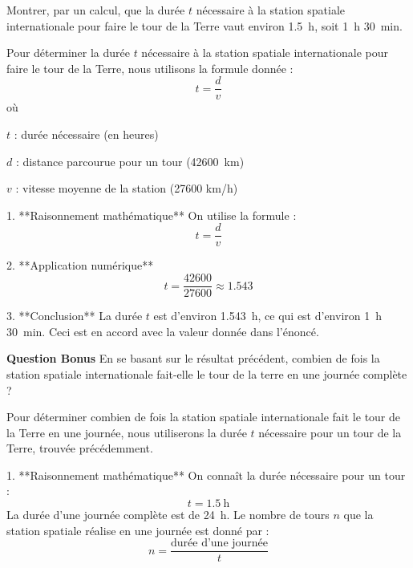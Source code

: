 \documentclass[answers]{exam}
\begin{document}
\begin{questions}
  Montrer, par un calcul, que la durée $t$ nécessaire à la station spatiale internationale pour faire le tour de la Terre vaut environ \SI{1.5}{\hour}, soit \SI{1}{\hour} \SI{30}{\minute}.
  
  

\begin{solution}
Pour déterminer la durée $t$ nécessaire à la station spatiale internationale pour faire le tour de la Terre, nous utilisons la formule donnée :
\[
t = \frac{d}{v}
\]
où

\begin{addmargin}[4em]{1em}
    \begin{compactitem}
        \item [$t$] : durée nécessaire (en heures)
        \item [$d$] : distance parcourue pour un tour (\SI{42600}{\kilo\meter})
        \item [$v$] : vitesse moyenne de la station (\num{27600} \unit[per-mode = symbol]{\kilo\meter\per\hour})
    \end{compactitem}
\end{addmargin}

1. **Raisonnement mathématique**  
   On utilise la formule :  
   \[
   t = \frac{d}{v}
   \]

2. **Application numérique**  
   \[
   t = \frac{42600}{27600} \approx 1.543
   \]

3. **Conclusion**  
   La durée $t$ est d'environ \SI{1.543}{\hour}, ce qui est d'environ \SI{1}{\hour} \SI{30}{\minute}. Ceci est en accord avec la valeur donnée dans l'énoncé.
\end{solution}

\question[2] \textbf{Question Bonus} En se basant sur le résultat précédent, combien de fois la station spatiale internationale fait-elle le tour de la terre en une journée complète ?



\begin{solution}
Pour déterminer combien de fois la station spatiale internationale fait le tour de la Terre en une journée, nous utiliserons la durée $t$ nécessaire pour un tour de la Terre, trouvée précédemment.

1. **Raisonnement mathématique**  
   On connaît la durée nécessaire pour un tour :
   \[
   t = \SI{1.5}{\hour}
   \]
   La durée d'une journée complète est de \SI{24}{\hour}. Le nombre de tours $n$ que la station spatiale réalise en une journée est donné par :
   \[
   n = \frac{\text{durée d'une journée}}{t}
   \]


\end{solution}
\end{questions}
\end{document}

